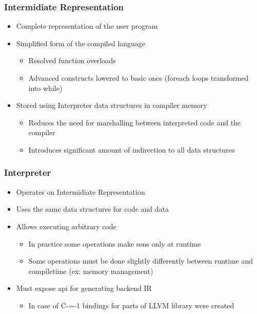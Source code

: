 \begin{frame}
    \frametitle{Intermidiate Representation}

    \begin{itemize}
        \item Complete representation of the user program
        \item Simplified form of the compiled language\begin{itemize}
            \item Resolved function overloads
            \item Advanced constructs lowered to basic ones (foreach loops transformed into while)
        \end{itemize}
        \item Stored using Interpreter data structures in compiler memory\begin{itemize}
            \item Reduces the need for marshalling between interpreted code and the compiler
            \item Introduces significant amount of indirection to all data structures
        \end{itemize}
    \end{itemize}

\end{frame}

\begin{frame}
    \frametitle{Interpreter}

    \begin{itemize}
        \item Operates on Intermidiate Representation 
        \item Uses the same data structures for code and data
        \item Allows executing arbitrary code \begin{itemize}
            \item In practice some operations make sens only at runtime
            \item Some operations must be done slightly differently between runtime and compiletime (ex: memory management)
        \end{itemize}
        \item Must expose api for generating backend IR\begin{itemize}
            \item In case of C-=-1 bindings for parts of LLVM library were created
        \end{itemize}
    \end{itemize}

\end{frame}

